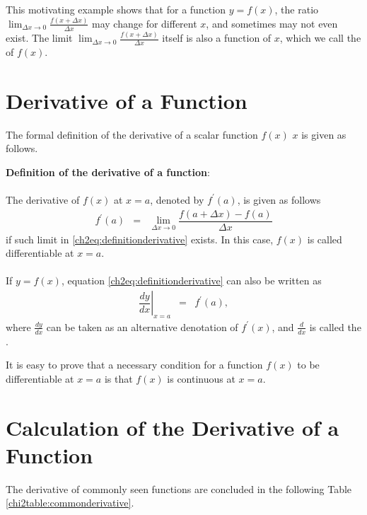 This motivating example shows that for a function $y=f(x)$, the ratio $\lim_{\Delta x \rightarrow 0}\frac{f(x + \Delta x)}{\Delta x}$ may change for different $x$, and sometimes may not even exist. The limit  $\lim_{\Delta x \rightarrow 0}\frac{f(x + \Delta x)}{\Delta x}$ itself is also a function of $x$, which we call the  of $f(x)$.

\section{Derivative of a Function}

The formal definition of the derivative of a scalar function $f(x)$  $x$ is given as follows.

\begin{mdframed}
\textbf{Definition of the derivative of a function}:
\\
\\
\noindent The derivative of $f(x)$ at $x=a$, denoted by $f^\prime(a)$, is given as follows
\begin{eqnarray}
  f^\prime(a) &=& \lim_{\Delta x \rightarrow 0}\dfrac{f\left(a + \Delta x\right)-f(a)}{\Delta x} \label{ch2eq:definitionderivative}
\end{eqnarray}
if such limit in \eqref{ch2eq:definitionderivative} exists. In this case, $f(x)$ is called differentiable at $x=a$.
\\
\\
If $y=f(x)$, equation \eqref{ch2eq:definitionderivative} can also be written as
\begin{eqnarray}
  \left.\dfrac{dy}{dx}\right|_{x=a} &=& f^\prime(a), \nonumber
\end{eqnarray}
where $\frac{dy}{dx}$ can be taken as an alternative denotation of $f^\prime(x)$, and $\frac{d}{dx}$ is called the .
\end{mdframed}

It is easy to prove that a necessary condition for a function $f(x)$ to be differentiable at $x=a$ is that $f(x)$ is continuous at $x=a$.

\section{Calculation of the Derivative of a Function}

The derivative of commonly seen functions are concluded in the following Table \ref{chi2table:commonderivative}.

